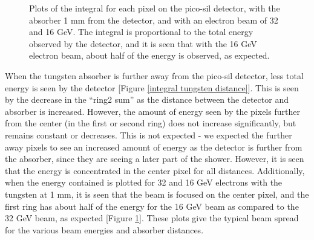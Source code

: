 \documentclass[twocolumn,aps,prd,reprint]{revtex4-1}
\begin{document}
\begin{figure}[!htbp]
\caption{Plots of the integral for each pixel on the pico-sil detector, with the absorber 1 mm from the detector, and with an electron beam of 32 and 16 GeV. The integral is proportional to the total energy observed by the detector, and it is seen that with the 16 GeV electron beam, about half of the energy is observed, as expected.}
\label{integral tungsten energy}
\end{figure}

When the tungsten absorber is further away from the pico-sil detector, less total energy is seen by the detector [Figure \ref{integral tungsten distance}]. This is seen by the decrease in the ``ring2 sum'' as the distance between the detector and absorber is increased. However, the amount of energy seen by the pixels further from the center (in the first or second ring) does not increase significantly, but remains constant or decreases. This is not expected - we expected the further away pixels to see an increased amount of energy as the detector is further from the absorber, since they are seeing a later part of the shower. However, it is seen that the energy is concentrated in the center pixel for all distances. Additionally, when the energy contained is plotted for 32 and 16 GeV electrons with the tungsten at 1 mm, it is seen that the beam is focused on the center pixel, and the first ring has about half of the energy for the 16 GeV beam as compared to the 32 GeV beam, as expected [Figure \ref{integral tungsten energy}]. These plots give the typical beam spread for the various beam energies and absorber distances.
\end{document}
